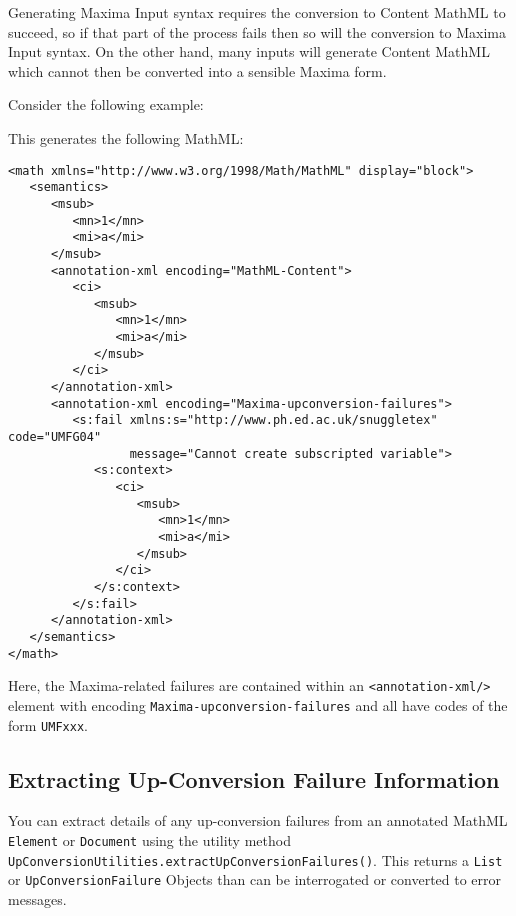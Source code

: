 Generating Maxima Input syntax requires the conversion to Content MathML to
succeed, so if that part of the process fails then so will the conversion to
Maxima Input syntax. On the other hand, many inputs will generate Content MathML
which cannot then be converted into a sensible Maxima form.

Consider the following example:


This generates the following MathML:

\begin{verbatim}
<math xmlns="http://www.w3.org/1998/Math/MathML" display="block">
   <semantics>
      <msub>
         <mn>1</mn>
         <mi>a</mi>
      </msub>
      <annotation-xml encoding="MathML-Content">
         <ci>
            <msub>
               <mn>1</mn>
               <mi>a</mi>
            </msub>
         </ci>
      </annotation-xml>
      <annotation-xml encoding="Maxima-upconversion-failures">
         <s:fail xmlns:s="http://www.ph.ed.ac.uk/snuggletex" code="UMFG04"
                 message="Cannot create subscripted variable">
            <s:context>
               <ci>
                  <msub>
                     <mn>1</mn>
                     <mi>a</mi>
                  </msub>
               </ci>
            </s:context>
         </s:fail>
      </annotation-xml>
   </semantics>
</math>
\end{verbatim}

Here, the Maxima-related failures are contained within an
\verb|<annotation-xml/>| element with encoding \verb|Maxima-upconversion-failures|
and all have codes of the form \verb|UMFxxx|.

\subsection*{Extracting Up-Conversion Failure Information}

You can extract details of any up-conversion failures from an annotated MathML
\verb|Element| or \verb|Document| using the utility method
\verb|UpConversionUtilities.extractUpConversionFailures()|. This returns
a \verb|List| or \verb|UpConversionFailure| Objects than can be interrogated or
converted to error messages.
